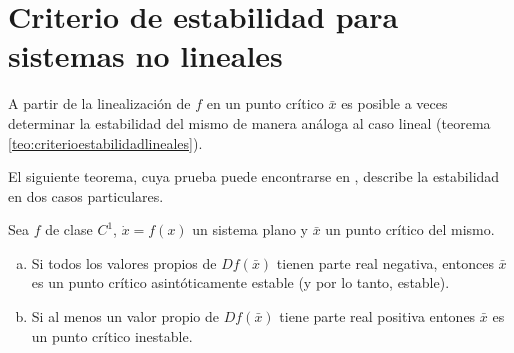 \section{Criterio de estabilidad para sistemas no lineales}
A partir de la linealización de $f$ en un punto crítico $\bar{x}$ es posible a veces determinar la estabilidad del mismo de manera análoga al caso lineal (teorema \ref{teo:criterioestabilidadlineales}).

El siguiente teorema, cuya prueba puede encontrarse en \cite[p.~267,272]{dynandbif}, describe la estabilidad en dos casos particulares.

\begin{theorem} \label{teo:criterioestabilidadnolineales}
Sea $f$ de clase $C^1$, $\dot{x} = f(x)$ un sistema plano y $\bar{x}$ un punto crítico del mismo.

\begin{enumerate}[(a)]
	\item Si todos los valores propios de $Df(\bar{x})$ tienen parte real negativa, entonces $\bar{x}$ es un punto crítico asintóticamente estable (y por lo tanto, estable).
	\item Si al menos un valor propio de $Df(\bar{x})$ tiene parte real positiva entones $\bar{x}$ es un punto crítico inestable.
\end{enumerate}
\end{theorem}

